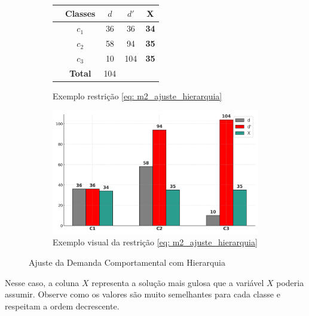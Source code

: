 \begin{figure}[H]
	\centering
	\begin{subfigure}[b]{0.45\linewidth}
		\centering
		\begin{tabular}{lcccc}
			\toprule
			\textbf{} & \textbf{Classes} & \textbf{$d$} & \textbf{$d'$} & \textbf{X}  \\
			\midrule
			          & $c_1$            & 36           & 36            & \textbf{34} \\
			          & $c_2$            & 58           & 94            & \textbf{35} \\
			          & $c_3$            & 10           & 104           & \textbf{35} \\
			\midrule
			          & \textbf{Total}   & 104          &               &             \\
			\bottomrule
		\end{tabular}
		\caption{Exemplo restrição  \ref{eq: m2_ajuste_hierarquia}}
		\label{tab:exe_ajuste_dem_hierarquia}
	\end{subfigure}\hspace{5mm}
	\begin{subfigure}[b]{0.45\linewidth}
		\centering
		\includegraphics[width=\linewidth]{img/dem_hierar.png}
		\caption{Exemplo visual da restrição \ref{eq: m2_ajuste_hierarquia}}
		\label{fig:dem_classes}
	\end{subfigure}
	\caption{Ajuste da Demanda Comportamental com Hierarquia}
	\label{fig:ajustes_demanda_hierar}
\end{figure}

Nesse caso, a coluna $X$ representa a solução mais gulosa que a variável $X$ poderia assumir. Observe como os valores são muito semelhantes para cada classe e respeitam a ordem decrescente.

